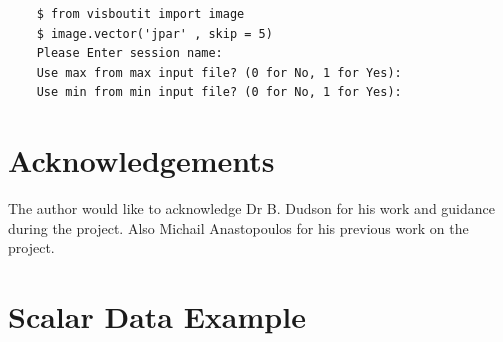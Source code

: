 \documentclass[12pt,a4paper]{article}
\begin{document}
\begin{verbatim}
	$ from visboutit import image
	$ image.vector('jpar' , skip = 5)
	Please Enter session name: 
	Use max from max input file? (0 for No, 1 for Yes):
	Use min from min input file? (0 for No, 1 for Yes):
\end{verbatim}


\section{Acknowledgements}
The author would like to acknowledge Dr B. Dudson for his work and guidance during the project. Also Michail Anastopoulos for his previous work on the project.

\appendix

\section{Scalar Data Example}
\label{example:scalar}
\end{document}
